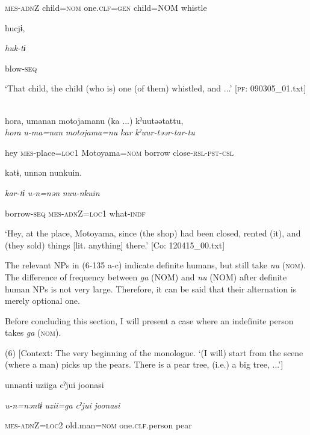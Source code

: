       \textsc{mes}-\textsc{adn}Z  child=\textsc{nom}  one.\textsc{clf}=\textsc{gen}  child=NOM  whistle

      hucjɨ,

      \textit{huk-tɨ}

      blow-\textsc{seq}

\glt ‘That child, the child (who is) one (of them) whistled, and ...’ [\textsc{pf}: 090305\_01.txt]
\z

 \ex{}\\
{\TM}
\gll  {\textbar}hora{\textbar},  umanan  motojamanu  (ka ...)  kˀuutəətattu,\\

      \textit{hora}  \textit{u-ma=nan}  \textit{motojama=nu}  \textit{kar}  \textit{kˀuur-təər-tar-tu}

      hey  \textsc{mes}-place=\textsc{loc}1  Motoyama=\textsc{nom}  borrow  close-\textsc{rsl}-\textsc{pst}-\textsc{csl}

      katɨ,  unnən  nunkuin.

      \textit{kar-tɨ}  \textit{u-n=nən}  \textit{nuu-nkuin}

      borrow-\textsc{seq}  \textsc{mes}-\textsc{adn}Z=\textsc{loc}1  what-\textsc{indf}

\glt ‘Hey, at the place, Motoyama, since (the shop) had been closed, rented (it), and (they sold) things [lit. anything] there.’ [Co: 120415\_00.txt]
\z

The relevant NPs in (6-135 a-c) indicate definite humans, but still take \textit{nu} (\textsc{nom}). The difference of frequency between \textit{ga} (NOM) and \textit{nu} (NOM) after definite human NPs is not very large. Therefore, it can be said that their alternation is merely optional one.

  Before concluding this section, I will present a case where an indefinite person takes \textit{ga} (\textsc{nom}).

(6)  [Context: The very beginning of the monologue. {\TM} ‘(I will) start from the scene (where a man) picks up the pears. There is a pear tree, (i.e.) a big tree, ...’]

{\TM}
\gll unnəntɨ  uziiga  cˀjui  joonasi

    \textit{u-n=nəntɨ}  \textit{uzii=ga}  \textit{cˀjui}  \textit{joonasi}

    \textsc{mes}-\textsc{adn}Z=\textsc{loc}2  old.man=\textsc{nom}  one.\textsc{clf}.person  pear

